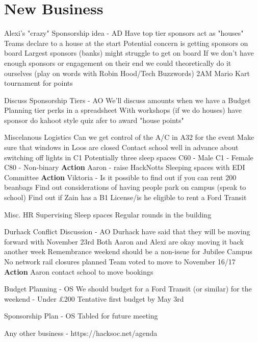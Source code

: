 \documentclass[11pt,hacksoc]{meetingmins}
\begin{document}
\section{New Business}
\begin{items}
  \item Alexi's "crazy" Sponsorship idea - AD
    \subitem Have top tier sponsors act as "houses"
    \subitem Teams declare to a house at the start
    \subitem Potential concern is getting sponsors on board
      \subsubitem Largest sponsors (banks) might struggle to get on board
    \subitem If we don't have enough sponsors or engagement on their end we could theoretically do it ourselves (play on words with Robin Hood/Tech Buzzwords)
    \subitem 2AM Mario Kart tournament for points
  \item Discuss Sponsorship Tiers - AO
    \subitem We'll discuss amounts when we have a Budget
    \subitem Planning tier perks in a spreadsheet
    \subitem With workshops (if we do houses) have sponsor do kahoot style quiz afer to award "house points"
  \item Miscelanous Logistics
    \subitem Can we get control of the A/C in A32 for the event
    \subitem Make sure that windows in Loos are closed
    \subitem Contact school well in advance about switching off lights in C1
    \subitem Potentially three sleep spaces
      \subsubitem C60 - Male
      \subsubitem C1 - Female
      \subsubitem C80 - Non-binary
    \subitem \textbf{Action} Aaron - raise HackNotts Sleeping spaces with EDI Committee
    \subitem \textbf{Action} Viktoria - Is it possible to find out if you can rent 200 beanbags
    \subitem Find out considerations of having people park on campus (speak to school)
    \subitem Find out if Zain has a B1 License/is he eligible to rent a Ford Transit
  \item Misc. HR
    \subitem Supervising Sleep spaces
    \subitem Regular rounds in the building
  \item Durhack Conflict Discussion - AO
    \subitem Durhack have said that they will be moving forward with November 23rd
    \subitem Both Aaron and Alexi are okay moving it back another week
    \subitem Remembrance weekend should be a non-issue for Jubilee Campus
    \subitem No network rail closures planned
    \subitem Team voted to move to November 16/17
    \subitem \textbf{Action} Aaron contact school to move bookings
  \item Budget Planning - OS
    \subitem We should budget for a Ford Transit (or similar) for the weekend - Under \pounds200
    \subitem Tentative first budget by May 3rd
  \item Sponsorship Plan - OS
    \subitem Tabled for future meeting
  \item Any other business - https://hacksoc.net/agenda
\end{items}

\vspace{1em}
\end{document}
